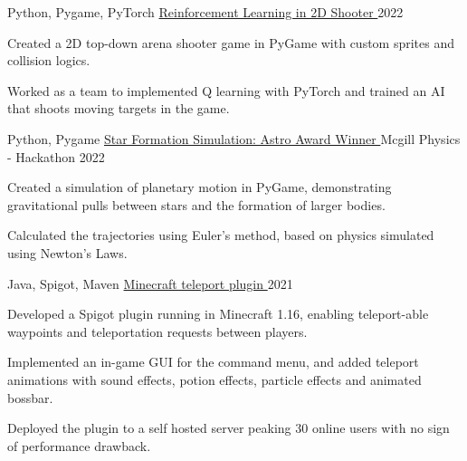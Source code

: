 

\begin{cventries}

  \cventry
    {Python, Pygame, PyTorch} %
    {\href{https://github.com/shiqui/TSDP-Reinforcement-Learning-in-Video-Games}{Reinforcement Learning in 2D Shooter {\faLink}}} %
    {} %
    {2022} %
    {
      \begin{cvitems} %
        \item {Created a 2D top-down arena shooter game in PyGame with custom sprites and collision logics.}
        \item {Worked as a team to implemented Q learning with PyTorch and trained an AI that shoots moving targets in the game.}
      \end{cvitems}
    }

  \cventry
    {Python, Pygame} %
    {\href{https://devpost.com/software/star-formation}{Star Formation Simulation: Astro Award Winner {\faLink}}} %
    {Mcgill Physics - Hackathon} %
    {2022} %
    {
      \begin{cvitems} %
        \item {Created a simulation of planetary motion in PyGame, demonstrating gravitational pulls between stars and the formation of larger bodies.}
        \item {Calculated the trajectories using Euler's method, based on physics simulated using Newton's Laws.}
      \end{cvitems}
    }
    
  \cventry
    {Java, Spigot, Maven} %
    {\href{https://github.com/shiqui/Teleport-Plugin}{Minecraft teleport plugin {\faLink}}} %
    {} %
    {2021} %
    {
      \begin{cvitems} %
        \item {Developed a Spigot plugin running in Minecraft 1.16, enabling teleport-able waypoints and teleportation requests between players.}
        \item {Implemented an in-game GUI for the command menu, and added teleport animations with sound effects, potion effects, particle effects and animated bossbar.}
        \item {Deployed the plugin to a self hosted server peaking 30 online users with no sign of performance drawback.}
      \end{cvitems}
    }


\end{cventries}
